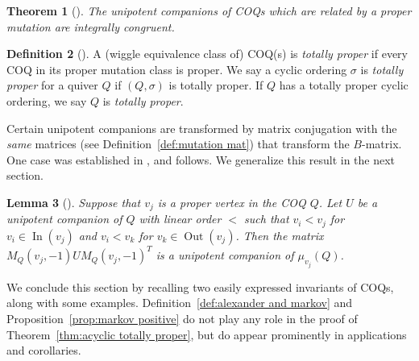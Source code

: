 \documentclass[11pt, letterpaper]{amsart}
\newtheorem{theorem}{Theorem}[section]
\newtheorem{corollary}[theorem]{Corollary}
\newtheorem{lemma}[theorem]{Lemma}
\theoremstyle{definition}
\newtheorem{definition}[theorem]{Definition}
\numberwithin{equation}{section}
\def\In{{\operatorname{In}}}
\def\Out{{\operatorname{Out}}}
\begin{document}
\begin{theorem}[{\cite[Theorem 7.1]{COQ}}]
\label{thm:payoff}
The unipotent companions of COQs which are related by a proper mutation are integrally congruent.
\end{theorem}

\begin{definition}[{\cite[Definition 14.1]{COQ}}]
A (wiggle equivalence class of) COQ(s) is \emph{totally proper} if every COQ in its proper mutation class is proper.
We say a cyclic ordering $\sigma$ is \emph{totally proper} for a quiver $Q$ if $(Q,\sigma)$ is totally proper.
If $Q$ has a totally proper cyclic ordering, we say $Q$ is \emph{totally proper}.
\end{definition}



Certain unipotent companions are transformed by matrix conjugation with the \emph{same} matrices (see Definition~\ref{def:mutation mat}) that transform the $B$-matrix.
One case was established in \cite{COQ}, and follows.
We generalize this result in the next section.

\begin{lemma}[{\cite[Lemma 7.2 and Remark 7.3]{COQ}}]
\label{lem:mutates like B v1}
Suppose that $v_j$ is a proper vertex in the COQ $Q$.
Let $U$ be a unipotent companion of $Q$ with linear order $<$ such that $v_i < v_j$ for $v_i \in \In(v_j)$ and $v_i < v_k$ for $v_k \in \Out(v_j)$.
Then the matrix $M_Q(v_j, -1) U M_Q(v_j, -1)^T$ is a unipotent companion of $\mu_{v_j}(Q)$.
\end{lemma}

We conclude this section by recalling two easily expressed invariants of COQs, along with some examples.
Definition~\ref{def:alexander and markov} and Proposition~\ref{prop:markov positive} do not play any role in the proof of Theorem~\ref{thm:acyclic totally proper}, but do appear prominently in applications and corollaries. 
\end{document}
